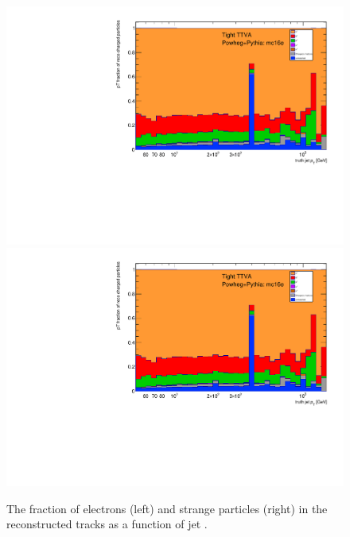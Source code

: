 \begin{figure}[b]
\centering
\includegraphics[scale=0.3, page=14]{figures/jet_comp_study_powheg_Tight_pTFraction_mc16e.pdf}
\includegraphics[scale=0.3, page=15]{figures/jet_comp_study_powheg_Tight_pTFraction_mc16e.pdf}
\caption {The fraction of electrons (left) and strange particles (right) in the reconstructed tracks as a function of jet \pT.}
\label{fig:electrons_sparticles}
\end{figure}

\clearpage

